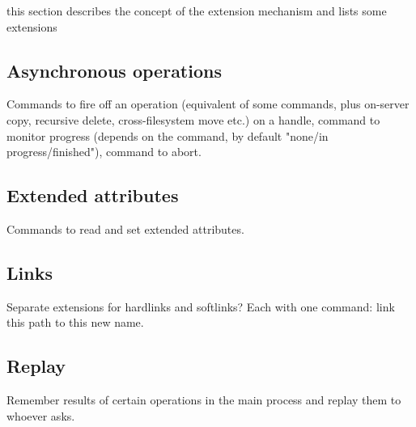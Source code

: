 this section describes the concept of the extension mechanism and lists some extensions

\subsection{Asynchronous operations}

Commands to fire off an operation (equivalent of some commands, plus on-server copy, recursive delete,
cross-filesystem move etc.) on a handle, command to monitor progress (depends on the command, by default
"none/in progress/finished"), command to abort.

\subsection{Extended attributes}

Commands to read and set extended attributes.

\subsection{Links}

Separate extensions for hardlinks and softlinks? Each with one command: link this path to this new name.

\subsection{Replay}

Remember results of certain operations in the main process and replay them to whoever asks.
